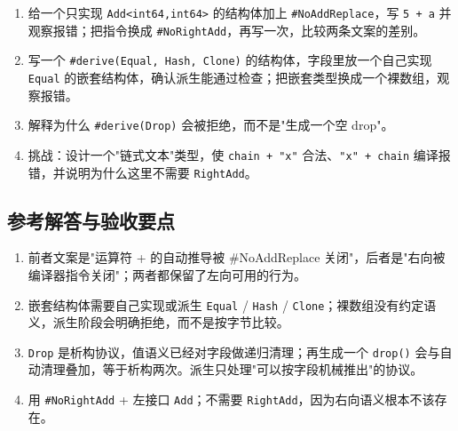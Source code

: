 \begin{enumerate}

\item 给一个只实现 \texttt{Add<\allowbreak{}int64,\allowbreak{}int64>\allowbreak{}} 的结构体加上 \texttt{\#No\allowbreak{}Add\allowbreak{}Replace}，写 \texttt{5 + a} 并观察报错；把指令换成 \texttt{\#No\allowbreak{}Right\allowbreak{}Add}，再写一次，比较两条文案的差别。

\item 写一个 \texttt{\#derive(\allowbreak{}Equal,\allowbreak{} Hash,\allowbreak{} Clone)\allowbreak{}} 的结构体，字段里放一个自己实现 \texttt{Equal} 的嵌套结构体，确认派生能通过检查；把嵌套类型换成一个裸数组，观察报错。

\item 解释为什么 \texttt{\#derive(\allowbreak{}Drop)\allowbreak{}} 会被拒绝，而不是"生成一个空 drop"。

\item 挑战：设计一个"链式文本"类型，使 \texttt{chain + "x"} 合法、\texttt{"x" + chain} 编译报错，并说明为什么这里不需要 \texttt{Right\allowbreak{}Add}。

\end{enumerate}

\subsection*{参考解答与验收要点}

\begin{enumerate}

\item 前者文案是"运算符 + 的自动推导被 \#NoAddReplace 关闭"，后者是"右向被编译器指令关闭"；两者都保留了左向可用的行为。

\item 嵌套结构体需要自己实现或派生 \texttt{Equal} / \texttt{Hash} / \texttt{Clone}；裸数组没有约定语义，派生阶段会明确拒绝，而不是按字节比较。

\item \texttt{Drop} 是析构协议，值语义已经对字段做递归清理；再生成一个 \texttt{drop(\allowbreak{})\allowbreak{}} 会与自动清理叠加，等于析构两次。派生只处理"可以按字段机械推出"的协议。

\item 用 \texttt{\#No\allowbreak{}Right\allowbreak{}Add} + 左接口 \texttt{Add}；不需要 \texttt{Right\allowbreak{}Add}，因为右向语义根本不该存在。

\end{enumerate}

